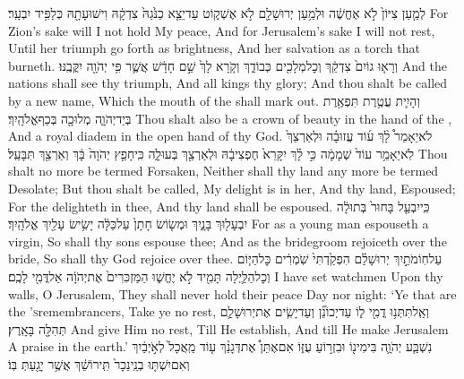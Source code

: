 \newperek
{}
{לְמַ֤עַן צִיּוֹן֙ לֹ֣א אֶחֱשֶׁ֔ה וּלְמַ֥עַן יְרוּשָׁלַ֖͏ִם לֹ֣א אֶשְׁק֑וֹט עַד\maqqaf יֵצֵ֤א כַנֹּ֙גַהּ֙ צִדְקָ֔הּ וִישׁוּעָתָ֖הּ כְּלַפִּ֥יד יִבְעָֽר׃}
{For Zion’s sake will I not hold My peace, And for Jerusalem’s sake I will not rest, Until her triumph go forth as brightness, And her salvation as a torch that burneth.}
{וְרָא֤וּ גוֹיִם֙ צִדְקֵ֔ךְ וְכׇל\maqqaf מְלָכִ֖ים כְּבוֹדֵ֑ךְ וְקֹ֤רָא לָךְ֙ שֵׁ֣ם חָדָ֔שׁ אֲשֶׁ֛ר פִּ֥י יְהֹוָ֖ה יִקֳּבֶֽנּוּ׃}
{And the nations shall see thy triumph, And all kings thy glory; And thou shalt be called by a new name, Which the mouth of the \lord\space shall mark out.}
{וְהָיִ֛ית עֲטֶ֥רֶת תִּפְאֶ֖רֶת בְּיַד\maqqaf יְהֹוָ֑ה  מְלוּכָ֖ה בְּכַף\maqqaf אֱלֹהָֽיִךְ׃}
{Thou shalt also be a crown of beauty in the hand of the \lord, And a royal diadem in the open hand of thy God.}
{לֹא\maqqaf יֵאָמֵר֩ לָ֨ךְ ע֜וֹד עֲזוּבָ֗ה וּלְאַרְצֵךְ֙ לֹֽא\maqqaf יֵאָמֵ֥ר עוֹד֙ שְׁמָמָ֔ה כִּ֣י לָ֗ךְ יִקָּרֵא֙ חֶפְצִי\maqqaf בָ֔הּ וּלְאַרְצֵ֖ךְ בְּעוּלָ֑ה כִּֽי\maqqaf חָפֵ֤ץ יְהֹוָה֙ בָּ֔ךְ וְאַרְצֵ֖ךְ תִּבָּעֵֽל׃}
{Thou shalt no more be termed Forsaken, Neither shall thy land any more be termed Desolate; But thou shalt be called, My delight is in her, And thy land, Espoused; For the \lord\space delighteth in thee, And thy land shall be espoused.}
{כִּֽי\maqqaf יִבְעַ֤ל בָּחוּר֙ בְּתוּלָ֔ה יִבְעָל֖וּךְ בָּנָ֑יִךְ וּמְשׂ֤וֹשׂ חָתָן֙ עַל\maqqaf כַּלָּ֔ה יָשִׂ֥ישׂ עָלַ֖יִךְ אֱלֹהָֽיִךְ׃}
{For as a young man espouseth a virgin, So shall thy sons espouse thee; And as the bridegroom rejoiceth over the bride, So shall thy God rejoice over thee.}
{עַל\maqqaf חֽוֹמֹתַ֣יִךְ יְרוּשָׁלַ֗͏ִם הִפְקַ֙דְתִּי֙ שֹֽׁמְרִ֔ים כׇּל\maqqaf הַיּ֧וֹם וְכׇל\maqqaf הַלַּ֛יְלָה תָּמִ֖יד לֹ֣א יֶחֱשׁ֑וּ הַמַּזְכִּרִים֙ אֶת\maqqaf יְהֹוָ֔ה אַל\maqqaf דֳּמִ֖י לָכֶֽם׃}
{I have set watchmen Upon thy walls, O Jerusalem, They shall never hold their peace Day nor night: ‘Ye that are the \lord\textsc{’s}\space remembrancers, Take ye no rest,}
{וְאַֽל\maqqaf תִּתְּנ֥וּ דֳמִ֖י ל֑וֹ עַד\maqqaf יְכוֹנֵ֞ן וְעַד\maqqaf יָשִׂ֧ים אֶת\maqqaf יְרוּשָׁלַ֛͏ִם תְּהִלָּ֖ה בָּאָֽרֶץ׃}
{And give Him no rest, Till He establish, And till He make Jerusalem A praise in the earth.’}
{נִשְׁבַּ֧ע יְהֹוָ֛ה בִּימִינ֖וֹ וּבִזְר֣וֹעַ עֻזּ֑וֹ אִם\maqqaf אֶתֵּן֩ אֶת\maqqaf דְּגָנֵ֨ךְ ע֤וֹד מַֽאֲכָל֙ לְאֹ֣יְבַ֔יִךְ וְאִם\maqqaf יִשְׁתּ֤וּ בְנֵֽי\maqqaf נֵכָר֙ תִּֽירוֹשֵׁ֔ךְ אֲשֶׁ֥ר יָגַ֖עַתְּ בּֽוֹ׃}
